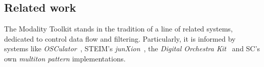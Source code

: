 \documentclass{article}
\newcommand{\todo}[1] {\emph{\textbf{TODO:} #1}}
\begin{document}
\subsection{Related work}
\label{sec:related_work}


The Modality Toolkit stands in the tradition of a line of related systems, dedicated to control data flow and filtering.
Particularly, it is informed by systems like \emph{OSCulator}~\cite{troillard2012-osc}, STEIM's \emph{junXion}~\cite{-jun}, the \emph{Digital Orchestra Kit}~\cite{malloch2008-a-n} and SC's own \emph{multiton pattern} implementations.
\end{document}
